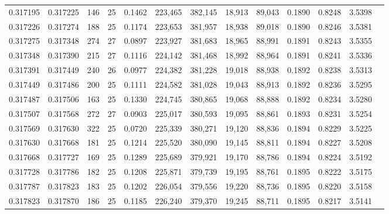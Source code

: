 \begin{tabular}{rrrrrrrrrrrrr}
0.317195 & 0.317225 &   146 &  25 &                                     0.1462 & 223,465 & 382,145 &  18,913 &  89,043 & 0.1890 & 0.8248 & 3.5398 \\
0.317226 & 0.317274 &   188 &  25 &                                     0.1174 & 223,653 & 381,957 &  18,938 &  89,018 & 0.1890 & 0.8246 & 3.5381 \\
0.317275 & 0.317348 &   274 &  27 &                                     0.0897 & 223,927 & 381,683 &  18,965 &  88,991 & 0.1891 & 0.8243 & 3.5355 \\
0.317348 & 0.317390 &   215 &  27 &                                     0.1116 & 224,142 & 381,468 &  18,992 &  88,964 & 0.1891 & 0.8241 & 3.5336 \\
0.317391 & 0.317449 &   240 &  26 &                                     0.0977 & 224,382 & 381,228 &  19,018 &  88,938 & 0.1892 & 0.8238 & 3.5313 \\
0.317449 & 0.317486 &   200 &  25 &                                     0.1111 & 224,582 & 381,028 &  19,043 &  88,913 & 0.1892 & 0.8236 & 3.5295 \\
0.317487 & 0.317506 &   163 &  25 &                                     0.1330 & 224,745 & 380,865 &  19,068 &  88,888 & 0.1892 & 0.8234 & 3.5280 \\
0.317507 & 0.317568 &   272 &  27 &                                     0.0903 & 225,017 & 380,593 &  19,095 &  88,861 & 0.1893 & 0.8231 & 3.5254 \\
0.317569 & 0.317630 &   322 &  25 &                                     0.0720 & 225,339 & 380,271 &  19,120 &  88,836 & 0.1894 & 0.8229 & 3.5225 \\
0.317630 & 0.317668 &   181 &  25 &                                     0.1214 & 225,520 & 380,090 &  19,145 &  88,811 & 0.1894 & 0.8227 & 3.5208 \\
0.317668 & 0.317727 &   169 &  25 &                                     0.1289 & 225,689 & 379,921 &  19,170 &  88,786 & 0.1894 & 0.8224 & 3.5192 \\
0.317728 & 0.317786 &   182 &  25 &                                     0.1208 & 225,871 & 379,739 &  19,195 &  88,761 & 0.1895 & 0.8222 & 3.5175 \\
0.317787 & 0.317823 &   183 &  25 &                                     0.1202 & 226,054 & 379,556 &  19,220 &  88,736 & 0.1895 & 0.8220 & 3.5158 \\
0.317823 & 0.317870 &   186 &  25 &                                     0.1185 & 226,240 & 379,370 &  19,245 &  88,711 & 0.1895 & 0.8217 & 3.5141 \\

\end{tabular}
